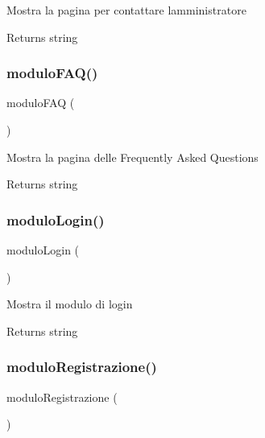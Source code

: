 Mostra la pagina per contattare l\textquotesingle{}amministratore

\begin{DoxyReturn}{Returns}
string 
\end{DoxyReturn}
\mbox{\label{class_c_registrazione_a074b38d1bcc227610ebef060d3ce7b02}} 
\subsubsection{\texorpdfstring{modulo\+F\+A\+Q()}{moduloFAQ()}}
{\footnotesize\ttfamily modulo\+F\+AQ (\begin{DoxyParamCaption}{ }\end{DoxyParamCaption})}

Mostra la pagina delle Frequently Asked Questions

\begin{DoxyReturn}{Returns}
string 
\end{DoxyReturn}
\mbox{\label{class_c_registrazione_ad172b8a64a14fdb3e2e8a3e964fefaed}} 
\subsubsection{\texorpdfstring{modulo\+Login()}{moduloLogin()}}
{\footnotesize\ttfamily modulo\+Login (\begin{DoxyParamCaption}{ }\end{DoxyParamCaption})}

Mostra il modulo di login

\begin{DoxyReturn}{Returns}
string 
\end{DoxyReturn}
\mbox{\label{class_c_registrazione_a0387e390a24bd1493f47a9de42dd52e3}} 
\subsubsection{\texorpdfstring{modulo\+Registrazione()}{moduloRegistrazione()}}
{\footnotesize\ttfamily modulo\+Registrazione (\begin{DoxyParamCaption}{ }\end{DoxyParamCaption})}

